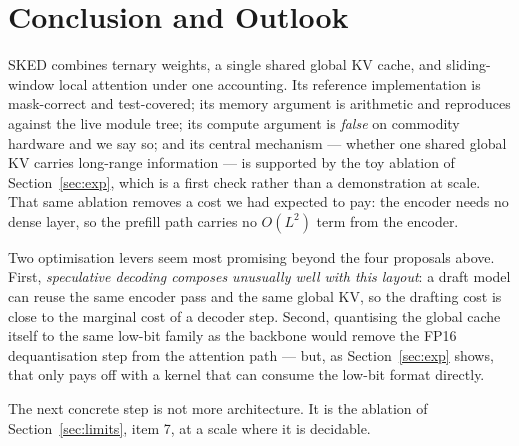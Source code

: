 \documentclass[10pt,conference]{IEEEtran}
\begin{document}
\section{Conclusion and Outlook}\label{sec:conc}

SKED combines ternary weights, a single shared global KV cache, and sliding-window
local attention under one accounting. Its reference implementation is mask-correct and
test-covered; its memory argument is arithmetic and reproduces against the live module
tree; its compute argument is \emph{false} on commodity hardware and we say so; and its
central mechanism --- whether one shared global KV carries long-range information --- is
supported by the toy ablation of Section~\ref{sec:exp}, which is a first check rather
than a demonstration at scale. That same ablation removes a cost we had expected to
pay: the encoder needs no dense layer, so the prefill path carries no $O(L^2)$ term
from the encoder.

Two optimisation levers seem most promising beyond the four proposals above. First,
\emph{speculative decoding composes unusually well with this layout}: a draft model can
reuse the same encoder pass and the same global KV, so the drafting cost is close to
the marginal cost of a decoder step. Second, quantising the global cache itself to the
same low-bit family as the backbone would remove the FP16 dequantisation step from the
attention path --- but, as Section~\ref{sec:exp} shows, that only pays off with a
kernel that can consume the low-bit format directly.

The next concrete step is not more architecture. It is the ablation of
Section~\ref{sec:limits}, item 7, at a scale where it is decidable.
\end{document}
